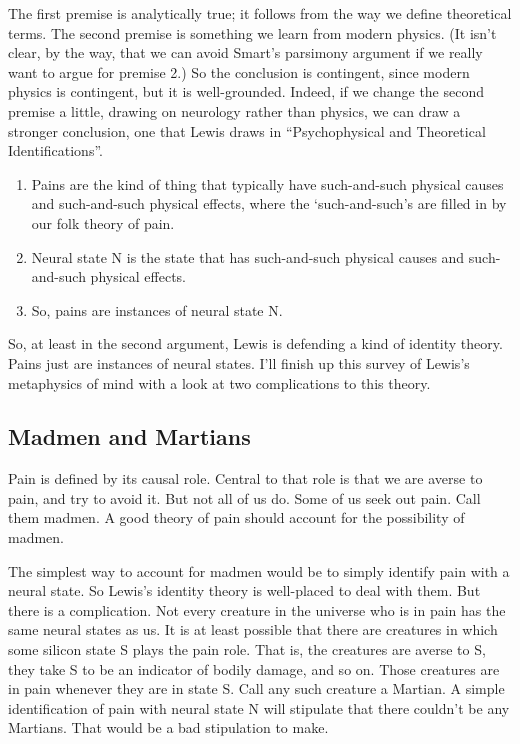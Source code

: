 \noindent The first premise is analytically true; it follows from the way we define theoretical terms. The second premise is something we learn from modern physics. (It isn't clear, by the way, that we can avoid Smart's parsimony argument if we really want to argue for premise 2.) So the conclusion is contingent, since modern physics is contingent, but it is well-grounded. Indeed, if we change the second premise a little, drawing on neurology rather than physics, we can draw a stronger conclusion, one that Lewis draws in ``Psychophysical and Theoretical Identifications''.

\begin{enumerate}

\item Pains are the kind of thing that typically have such-and-such physical causes and such-and-such physical effects, where the `such-and-such's are filled in by our folk theory of pain.

\item Neural state N is the state that has such-and-such physical causes and such-and-such physical effects.

\item So, pains are instances of neural state N.

\end{enumerate}

\noindent So, at least in the second argument, Lewis is defending a kind of identity theory. Pains just are instances of neural states. I'll finish up this survey of Lewis's metaphysics of mind with a look at two complications to this theory.

\subsection{Madmen and Martians} 
Pain is defined by its causal role. Central to that role is that we are averse to pain, and try to avoid it. But not all of us do. Some of us seek out pain. Call them madmen. A good theory of pain should account for the possibility of madmen.

The simplest way to account for madmen would be to simply identify pain with a neural state. So Lewis's identity theory is well-placed to deal with them. But there is a complication. Not every creature in the universe who is in pain has the same neural states as us. It is at least possible that there are creatures in which some silicon state S plays the pain role. That is, the creatures are averse to S, they take S to be an indicator of bodily damage, and so on. Those creatures are in pain whenever they are in state S. Call any such creature a Martian. A simple identification of pain with neural state N will stipulate that there couldn't be any Martians. That would be a bad stipulation to make.

